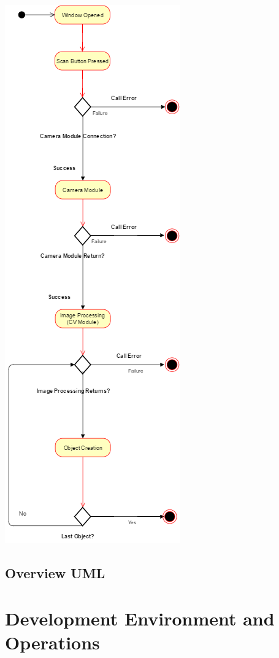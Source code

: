 \documentclass[12pt]{article}
\let\origfigure=\figure
\let\endorigfigure=\endfigure
\renewenvironment{figure}[1][]{%
  \origfigure[H]
}{%
  \endorigfigure
}
\begin{document}
\begin{figure}
\centering
\includegraphics{Figures/unityActivityDiagram.png}
\caption{Unity Activity Diagram}
\end{figure}

\subsection{Overview UML}\label{overview-uml}

\section{Development Environment and
Operations}\label{development-environment-and-operations}
\end{document}
